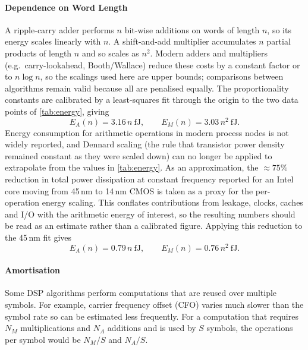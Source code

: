 \documentclass[12pt,a4paper]{report}
\begin{document}
\paragraph{Dependence on Word Length}
A ripple-carry adder performs \(n\) bit-wise additions on words of length \(n\), so its energy scales linearly with \(n\). A shift-and-add multiplier accumulates \(n\) partial products of length \(n\) and so scales as \(n^2\). Modern adders and multipliers (e.g.\ carry-lookahead, Booth/Wallace) reduce these costs by a constant factor or to $n\log n$, so the scalings used here are upper bounds; comparisons between algorithms remain valid because all are penalised equally. The proportionality constants are calibrated by a least-squares fit through the origin to the two data points of \cref{tab:energy}, giving
\begin{equation}
    E_A(n) = 3.16\,n \mathrm{\ fJ}, \qquad E_M(n) = 3.03\,n^2 \mathrm{\ fJ}.
    \label{eq:arithmetic_45}
\end{equation}
Energy consumption for arithmetic operations in modern process nodes is not widely reported, and Dennard scaling (the rule that transistor power density remained constant as they were scaled down) \cite{Esmaeilzadeh;11} can no longer be applied to extrapolate from the values in \cref{tab:energy}. As an approximation, the $\approx 75\%$ reduction in total power dissipation at constant frequency reported for an Intel core moving from 45\,nm to 14\,nm CMOS \cite{Shahidi;19} is taken as a proxy for the per-operation energy scaling. This conflates contributions from leakage, clocks, caches and I/O with the arithmetic energy of interest, so the resulting numbers should be read as an estimate rather than a calibrated figure. Applying this reduction to the 45\,nm fit gives
\begin{equation}
    E_A(n) = 0.79\,n \mathrm{\ fJ}, \qquad E_M(n) = 0.76\,n^2 \mathrm{\ fJ}.
    \label{eq:arithmetic_14}
\end{equation}
\paragraph{Amortisation}
Some DSP algorithms perform computations that are reused over multiple symbols. For example, carrier frequency offset (CFO) varies much slower than the symbol rate so can be estimated less frequently. For a computation that requires \(N_M\) multiplications and \(N_A\) additions and is used by \(S\) symbols, the operations per symbol would be \(N_M / S\) and \(N_A / S\).
\end{document}
